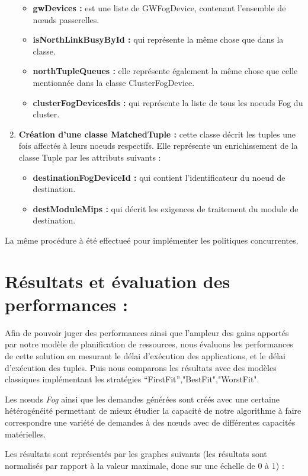 \begin{enumerate}
\begin{itemize}
     \item \textbf{gwDevices :} est une liste de GWFogDevice, contenant l'ensemble de nœuds passerelles.
     \item \textbf{isNorthLinkBusyById :} qui représente la même chose que dans la classe.
     \item \textbf{northTupleQueues :} elle représente également la même chose que celle mentionnée dans la classe ClusterFogDevice.
     \item \textbf{clusterFogDevicesIds :} qui représente la liste de tous les noeuds Fog du cluster.
     \end{itemize}
     \item \textbf{Création d'une classe MatchedTuple :} cette classe décrit les tuples une fois affectés à leurs noeuds respectifs. Elle représente un enrichissement de la classe Tuple par les attributs suivants :
     \begin{itemize}
         \item \textbf{destinationFogDeviceId :} qui contient l'identificateur du noeud de destination.
         \item \textbf{destModuleMips :} qui décrit les exigences de traitement du module de destination.
     \end{itemize}
\end{enumerate}
La même procédure à été effectueé pour implémenter les politiques concurrentes.

\section{Résultats et évaluation des performances :}
Afin de pouvoir juger des performances ainsi que l'ampleur des gains apportés par notre modèle de planification de ressources, nous évaluons les performances de cette solution en mesurant le délai d'exécution des applications, et le délai d'exécution des tuples. Puis nous comparons les résultats avec des modèles classiques implémentant les stratégies “FirstFit”,"BestFit","WorstFit".\par
Les nœuds \emph{Fog} ainsi que les demandes générées sont créés avec une certaine hétérogénéité permettant de mieux étudier la capacité de notre algorithme à faire correspondre une variété de demandes à des nœuds avec de différentes capacités matérielles.\par
Les résultats sont représentés par les graphes suivants (les résultats sont normalisés par rapport à la valeur maximale, donc sur une échelle de 0 à 1) :

